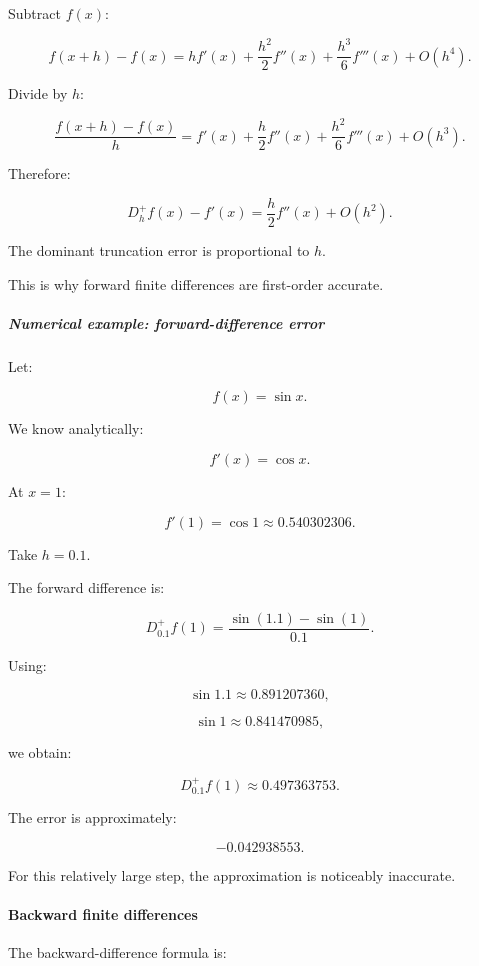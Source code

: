 Subtract \(f(x)\):

\[
f(x+h)-f(x) = hf'(x)+ \frac{h^2}{2}f''(x)+ \frac{h^3}{6}f'''(x)+O(h^4).
\]

Divide by \(h\):

\[
\frac{f(x+h)-f(x)}h = f'(x)+ \frac h2f''(x)+ \frac{h^2}{6}f'''(x)+O(h^3).
\]

Therefore:

\[
\boxed{ D_h^+f(x)-f'(x) = \frac h2f''(x)+O(h^2) }.
\]

The dominant truncation error is proportional to \(h\).

This is why forward finite differences are first-order accurate.

\subparagraph{Numerical example: forward-difference error}\label{02-foundations-ii-ch025-numerical-example-forward-difference-error}

\hypertarget{02-foundations-ii-ch025-numerical-example-forward-difference-error}{}

Let:

\[
f(x)=\sin x.
\]

We know analytically:

\[
f'(x)=\cos x.
\]

At \(x=1\):

\[
f'(1)=\cos1\approx0.540302306.
\]

Take \(h=0.1\).

The forward difference is:

\[
D_{0.1}^+f(1)= \frac{\sin(1.1)-\sin(1)}{0.1}.
\]

Using:

\[
\sin1.1\approx0.891207360,
\]

\[
\sin1\approx0.841470985,
\]

we obtain:

\[
\boxed{ D_{0.1}^+f(1)\approx0.497363753 }.
\]

The error is approximately:

\[
-0.042938553.
\]

For this relatively large step, the approximation is noticeably inaccurate.

\paragraph{Backward finite differences}\label{02-foundations-ii-ch025-backward-finite-differences}

\hypertarget{02-foundations-ii-ch025-backward-finite-differences}{}

The backward-difference formula is:

